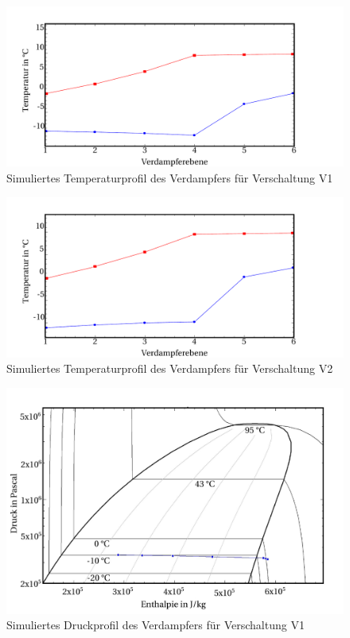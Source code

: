 \begin{figure}[h!]
\centering
\includegraphics[scale=0.6]{Pictures/Test61tempprofile.pdf}
\caption{Simuliertes Temperaturprofil des Verdampfers für Verschaltung V1}
\label{fig:SimTempV1}
\end{figure}

\begin{figure}[h!]
\centering
\includegraphics[scale=0.59]{Pictures/test61V2tempprofile.pdf}
\caption{Simuliertes Temperaturprofil des Verdampfers für Verschaltung V2}
\label{fig:SimTempV2}
\end{figure}

\begin{figure}[h!]
\centering
\includegraphics[scale=0.55]{Pictures/test61V1ogph.pdf}
\caption{Simuliertes Druckprofil des Verdampfers für Verschaltung V1}
\label{fig:SimDruckV1}
\end{figure}

